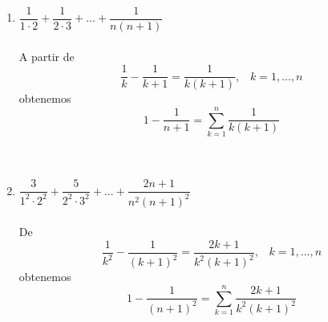 \begin{enumerate}
\begin{enumerate}[\bfseries (i)]
	 \item $\dfrac{1}{1 \cdot 2} + \dfrac{1}{2 \cdot 3} + ... + \dfrac{1}{n(n+1)}$\\\\ 
	 A partir de $$\dfrac{1}{k} - \dfrac{1}{k+1} = \dfrac{1}{k(k+1)}, \; \; \; k=1,...,n$$ obtenemos $$1-\dfrac{1}{n+1} = \displaystyle\sum_{k=1}^n \dfrac{1}{k(k+1)}$$ \\\\

	 \item $\dfrac{3}{1^2 \cdot 2^2} + \dfrac{5}{2^2 \cdot 3^2} + ... + \dfrac{2n +1}{n^2 (n+1)^2}$\\\\
	 De $$\dfrac{1}{k^2} - \dfrac{1}{(k+1)^2} = \dfrac{2k+1}{k^2(k+1)^2}, \; \; \; k=1,...,n$$ obtenemos $$1-\dfrac{1}{(n+1)^2} = \displaystyle\sum_{k=1}^n \dfrac{2k+1}{k^2(k+1)^2}$$  \\\\
	 \end{enumerate}


\end{enumerate}
